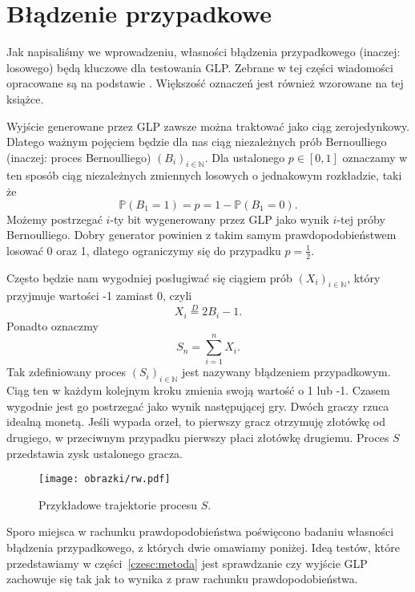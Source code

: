 \documentclass[a4paper,11pt,twoside]{book}
\newcommand{\Prob}{\mathbb{P}}
\theoremstyle{definition}
\begin{document}
\chapter{Błądzenie przypadkowe}
\label{czesc:bladzenie}

Jak napisaliśmy we wprowadzeniu, własności błądzenia przypadkowego (inaczej: losowego) będą kluczowe dla testowania GLP. Zebrane w tej części wiadomości opracowane są na podstawie \cite{feller}. Większość oznaczeń jest również wzorowane na tej książce.

Wyjście generowane przez GLP zawsze można traktować jako ciąg zerojedynkowy. Dlatego ważnym pojęciem będzie dla nas ciąg niezależnych prób Bernoulliego (inaczej: proces Bernoulliego) $(B_i)_{i \in \mathbb{N}}$. Dla ustalonego $p \in [0,1]$ oznaczamy w ten sposób ciąg niezależnych zmiennych losowych o jednakowym rozkładzie, taki że
\[ \Prob(B_1 = 1) = p = 1 - \Prob(B_1 = 0). \]
Możemy postrzegać $i$-ty bit wygenerowany przez GLP jako wynik $i$-tej próby Bernoulliego. Dobry generator powinien z takim samym prawdopodobieństwem losować 0 oraz 1, dlatego ograniczymy się do przypadku $p = \frac{1}{2}$.

Często będzie nam wygodniej posługiwać się ciągiem prób $(X_i)_{i \in \mathbb{N}}$, który przyjmuje wartości -1 zamiast 0, czyli
\[ X_i \stackrel{D}{=} 2 B_i -1. \]
Ponadto oznaczmy
\[ S_n = \sum_{i=1}^{n} X_i. \]
Tak zdefiniowany proces $(S_i)_{i \in \mathbb{N}}$ jest nazywany błądzeniem przypadkowym. Ciąg ten w każdym kolejnym kroku zmienia swoją wartość o 1 lub -1. Czasem wygodnie jest go postrzegać jako wynik następującej gry. Dwóch graczy rzuca idealną monetą. Jeśli wypada orzeł, to pierwszy gracz otrzymuję złotówkę od drugiego, w przeciwnym przypadku pierwszy płaci złotówkę drugiemu. Proces $S$ przedstawia zysk ustalonego gracza.

\begin{figure}[ht]
 \centering
 \texttt{[image: obrazki/rw.pdf]}
 \caption{Przykładowe trajektorie procesu $S$.}
 \label{fig:bladzenie}
\end{figure}

Sporo miejsca w rachunku prawdopodobieństwa poświęcono badaniu własności błądzenia przypadkowego, z których dwie omawiamy poniżej. Ideą testów, które przedstawiamy w części~\ref{czesc:metoda} jest sprawdzanie czy wyjście GLP zachowuje się tak jak to wynika z praw rachunku prawdopodobieństwa.
\end{document}
